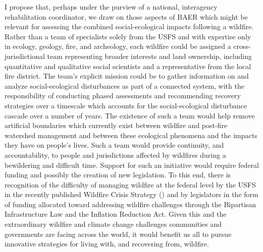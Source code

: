 \documentclass[
]{article}
\begin{document}
I propose that, perhaps under the purview of a national, interagency rehabilitation coordinator, we draw on those aspects of BAER which might be relevant for assessing the combined social-ecological impacts following a wildfire. Rather than a team of specialists solely from the USFS and with expertise only in ecology, geology, fire, and archeology, each wildfire could be assigned a cross-jurisdictional team representing broader interests and land ownership, including quantitative and qualitative social scientists and a representative from the local fire district. The team's explicit mission could be to gather information on and analyze social-ecological disturbances as part of a connected system, with the responsibility of conducting phased assessments and recommending recovery strategies over a timescale which accounts for the social-ecological disturbance cascade over a number of years. The existence of such a team would help remove artificial boundaries which currently exist between wildfire and post-fire watershed management and between these ecological phenomena and the impacts they have on people's lives. Such a team would provide continuity, and accountability, to people and jurisdictions affected by wildfires during a bewildering and difficult time. Support for such an initiative would require federal funding and possibly the creation of new legislation. To this end, there is recognition of the difficulty of managing wildfire at the federal level by the USFS in the recently published Wildfire Crisis Strategy () and by legislators in the form of funding allocated toward addressing wildfire challenges through the Bipartisan Infrastructure Law and the Inflation Reduction Act. Given this and the extraordinary wildfire and climate change challenges communities and governments are facing across the world, it would benefit us all to pursue innovative strategies for living with, and recovering from, wildfire.
\end{document}
